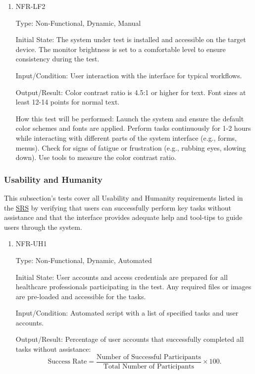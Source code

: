 \documentclass[12pt, titlepage]{article}
\begin{document}
\begin{enumerate}
\begin{enumerate}
\item{NFR-LF2\\}\label{NFR-LF2}

Type: Non-Functional, Dynamic, Manual

Initial State: The system under test is installed and accessible on the target device. The monitor brightness is set to a comfortable level to ensure consistency during the test.

Input/Condition: User interaction with the interface for typical workflows.

Output/Result: Color contrast ratio is 4.5:1 or higher for text. Font sizes at least 12-14 points for normal text.

How this test will be performed: Launch the system and ensure the default color schemes and fonts are applied. Perform tasks continuously for 1-2 hours while interacting with different parts of the system interface (e.g., forms, menus). Check for signs of fatigue or frustration (e.g., rubbing eyes, slowing down). Use tools to measure the color contrast ratio.

\end{enumerate}

\subsubsection{Usability and Humanity}

This subsection's tests cover all Usability and Humanity requirements listed in the \href{https://github.com/RezaJodeiri/CXR-Capstone/blob/main/docs/SRS/SRS.pdf}{SRS} \citep{SRS}
 by verifying that users can successfully perform key tasks without assistance and that the interface provides adequate help and tool-tips to guide users through the system.

 \begin{enumerate}

  \item{NFR-UH1\\}\label{NFR-UH1}
  
  Type: Non-Functional, Dynamic, Automated
  
  Initial State: User accounts and access credentials are prepared for all healthcare professionals participating in the test. Any required files or images are pre-loaded and accessible for the tasks.
  
  Input/Condition: Automated script with a list of specified tasks and user accounts.
  
  Output/Result: Percentage of user accounts that successfully completed all tasks without assistance: 
  \[
  \text{Success Rate} = \frac{\text{Number of Successful Participants}}{\text{Total Number of Participants}} \times 100.
  \]
  

\end{enumerate}
\end{enumerate}
\end{document}
